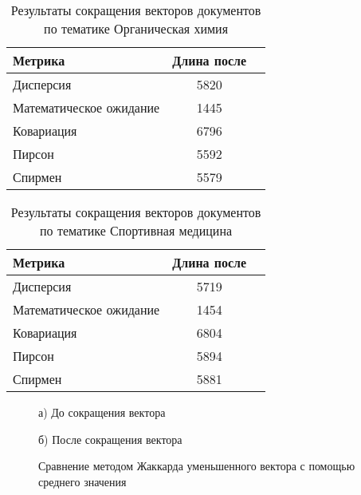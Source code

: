 \begin{table}[H]
    \centering
    \begin{tabular}{|l|c|c|}
    \hline
    \textbf{Метрика}                                  & \textbf{Длина после}             \\ \hline
    Дисперсия                                         & 5820                             \\ \hline
    Математическое ожидание                           & 1445                             \\ \hline
    Ковариация                                        & 6796                             \\ \hline
    Пирсон                                            & 5592                             \\ \hline
    Спирмен                                           & 5579                             \\ \hline
    \end{tabular}
    \caption{Результаты сокращения векторов документов по тематике Органическая химия}
    \label{tab:similarity}
\end{table}

\begin{table}[H]
    \centering
    \begin{tabular}{|l|c|c|}
    \hline
    \textbf{Метрика}                                  & \textbf{Длина после}             \\ \hline
    Дисперсия                                         & 5719                             \\ \hline
    Математическое ожидание                           & 1454                             \\ \hline
    Ковариация                                        & 6804                             \\ \hline
    Пирсон                                            & 5894                             \\ \hline
    Спирмен                                           & 5881                             \\ \hline
    \end{tabular}
    \caption{Результаты сокращения векторов документов по тематике Спортивная медицина}
    \label{tab:similarity}
\end{table}

\begin{figure}[H]
    \begin{minipage}[H]{0.5\linewidth}
        а) До сокращения вектора 
    \end{minipage}
    \begin{minipage}[H]{0.5\linewidth}
        б) После сокращения вектора 
    \end{minipage}
    \caption{Сравнение методом Жаккарда уменьшенного вектора с помощью среднего значения}
    \label{fig:heatmapMeanJac}
\end{figure}

